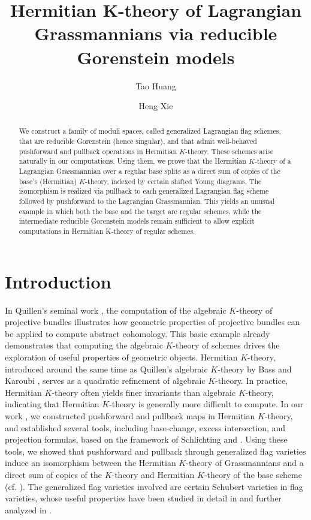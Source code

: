 \documentclass[a4paper]{amsart}
\author{Tao Huang}
\author{Heng Xie}
\title[Hermitian $K$-theory of Lagrangian Grassmannians]{Hermitian K-theory of Lagrangian Grassmannians via  reducible Gorenstein models}
\theoremstyle{plain}
\theoremstyle{definition}
\numberwithin{equation}{section}
\begin{document}
\begin{abstract}
    We construct a family of moduli spaces, called generalized Lagrangian flag schemes, that are reducible Gorenstein (hence singular), and that admit well-behaved pushforward and pullback operations in Hermitian $K$-theory. These schemes arise naturally in our computations. Using them, we prove that the Hermitian $K$-theory of a Lagrangian Grassmannian over a regular base splits as a direct sum of copies of the base's (Hermitian) $K$-theory, indexed by certain shifted Young diagrams. The isomorphism is realized via pullback to each generalized Lagrangian flag scheme followed by pushforward to the Lagrangian Grassmannian. This yields an unusual example in which both the base and the target are regular schemes,  while the intermediate reducible Gorenstein models remain sufficient to allow explicit computations in Hermitian K-theory of regular schemes.
\end{abstract}
\maketitle
\section{Introduction}
In Quillen's seminal work \cite{quillen1973higher}, the computation of the algebraic $K$-theory of projective bundles illustrates how geometric properties of projective bundles can be applied to compute abstract cohomology. This basic example already demonstrates that computing the algebraic $K$-theory of schemes drives the exploration of useful properties of geometric objects. Hermitian $K$-theory, introduced around the same time as Quillen's algebraic $K$-theory by Bass and Karoubi \cite{karoubi1974periodicite}, serves as a quadratic refinement of algebraic $K$-theory. In practice, Hermitian $K$-theory often yields finer invariants than algebraic $K$-theory, indicating that Hermitian $K$-theory is generally more difficult to compute. In our work \cite{huang2023the}, we constructed pushforward and pullback maps in Hermitian $K$-theory, and established several tools, including base-change, excess intersection, and projection formulas, based on the framework of Schlichting \cite{schlichting2010mayer} and \cite{schlichting2017hermitian}. Using these tools, we showed that pushforward and pullback through generalized flag varieties induce an isomorphism between the Hermitian $K$-theory of Grassmannians and a direct sum of copies of the $K$-theory and Hermitian $K$-theory of the base scheme (cf. \cite{huang2023the}). The generalized flag varieties involved are certain Schubert varieties in flag varieties, whose useful properties have been studied in detail in \cite{balmer2012witt} and further analyzed in \cite{huang2023the}.
\end{document}
